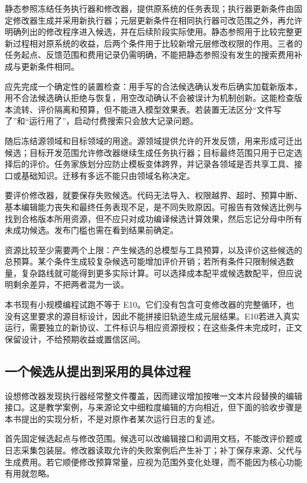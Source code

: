 静态参照冻结任务执行器和修改器，提供原系统的任务表现；执行器更新条件由固定修改器生成并采用新执行器；元层更新条件在相同执行器可改范围之外，再允许明确列出的修改程序进入候选，并在后续阶段实际使用。静态参照用于比较完整更新过程相对原系统的收益，后两个条件用于比较新增元层修改权限的作用。三者的任务起点、反馈范围和费用记录仍需明确，不能把静态参照没有发生的搜索费用补成与更新条件相同。

应先完成一个确定性的装置检查：用手写的合法候选确认发布后确实加载新版本，用不合法候选确认拒绝与恢复，用空改动确认不会被误计为机制创新。这能检查版本流转、评价隔离和预算，但不能进入模型效果表。若装置无法区分“文件写了”和“运行用了”，启动付费搜索只会放大记录问题。

随后冻结源领域和目标领域的用途。源领域提供允许的开发反馈，用来形成可迁出候选；目标开发范围允许修改器继续生成任务执行器；目标最终范围只用于已定选择后的评价。任务家族划分应防止模板变体跨界，并记录各领域是否共享工具、接口或基础知识。迁移有多远不能只由领域名称决定。

要评价修改器，就要保存失败候选。代码无法导入、权限越界、超时、预算中断、基本编辑能力丧失和最终任务表现不足，是不同失败原因。可报告有效候选比例与找到合格版本所用资源，但不应只对成功编译候选计算效果，然后忘记分母中所有未成功候选。发布门槛也需在看到结果前确定。

资源比较至少需要两个上限：产生候选的总模型与工具预算，以及评价这些候选的总预算。某个条件生成较复杂候选可能增加评价开销；若所有条件只限制候选数量，复杂路线就可能得到更多实际计算。可以选择成本配平或候选数配平，但应说明剩余差异，不把两者混为一谈。

本书现有小规模编程试跑不等于 E10。它们没有包含可变修改器的完整循环，也没有这里要求的源目标设计，因此不能拼接旧轨迹生成元层结果。E10若进入真实运行，需要独立的新协议、工件标识与相应资源授权；在这些条件未完成时，正文保留设计，不给预期收益或置信区间。

\subsection{一个候选从提出到采用的具体过程}
\label{sec:ch12-candidatewalk}

设想修改器发现执行器经常整文件覆盖，因而建议增加按唯一文本片段替换的编辑接口。这是教学案例，与来源论文中细粒度编辑的方向相近，但下面的验收步骤是本书提出的实现分析，不是对原作者某次运行日志的复述。

首先固定候选起点与修改范围。候选可以改编辑接口和调用文档，不能改评价题或日志采集包装层。修改器读取允许的失败案例后产生补丁；补丁保存来源、父代与生成费用。若它顺便修改预算常量，应视为范围外变化处理，而不能因为核心功能有用就忽略。

